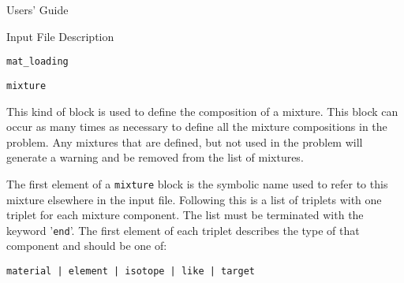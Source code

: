 \begin{chapter}{Users' Guide\label{app:user.guide}}
\begin{section}{Input File Description\label{app:user.input}}
\begin{subsection}{\texttt{mat\_loading}\label{app:user.input.loading}}
    \end{subsection}
 

    \begin{subsection}{\texttt{mixture}\label{app:user.input.mix}}
      
      This kind of block is used to define the composition of a
      mixture.  This block can occur as many times as necessary to
      define all the mixture compositions in the problem.  Any
      mixtures that are defined, but not used in the problem will
      generate a warning and be removed from the list of mixtures.
      
      The first element of a \texttt{mixture} block is the symbolic
      name used to refer to this mixture elsewhere in the input file.
      Following this is a list of triplets with one triplet for each
      mixture component.  The list must be terminated with the keyword
      '\texttt{end}'.  The first element of each triplet describes the
      type of that component and should be one of:
      \begin{center}
        \texttt{material | element | isotope | like | target}
      \end{center}
      

\end{subsection}
\end{section}
\end{chapter}

